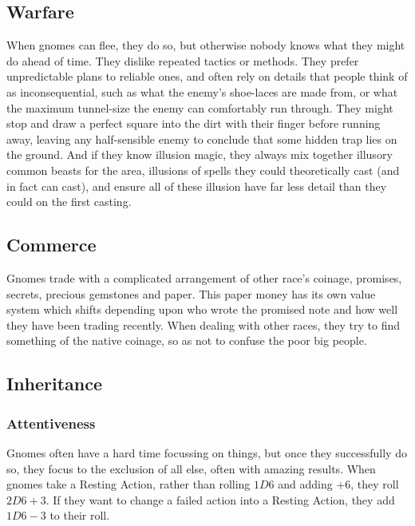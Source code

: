 \begin{multicols}{2}
\subsection{Warfare}

When gnomes can flee, they do so, but otherwise nobody knows what they might do ahead of time.
They dislike repeated tactics or methods.
They prefer unpredictable plans to reliable ones, and often rely on details that people think of as inconsequential, such as what the enemy's shoe-laces are made from, or what the maximum tunnel-size the enemy can comfortably run through.
They might stop and draw a perfect square into the dirt with their finger before running away, leaving any half-sensible enemy to conclude that some hidden trap lies on the ground.
And if they know illusion magic, they always mix together illusory common beasts for the area, illusions of spells they could theoretically cast (and in fact can cast), and ensure all of these illusion have far less detail than they could on the first casting.

\subsection{Commerce}

Gnomes trade with a complicated arrangement of other race's coinage, promises, secrets, precious gemstones and paper. This paper money has its own value system which shifts depending upon who wrote the promised note and how well they have been trading recently. When dealing with other races, they try to find something of the native coinage, so as not to confuse the poor big people.

\subsection{Inheritance}

\subsubsection[Attentiveness: roll 2D6+3 for resting actions]{Attentiveness}
\label{gnomishInheritance}

Gnomes often have a hard time focussing on things, but once they successfully do so, they focus to the exclusion of all else, often with amazing results.
When gnomes take a Resting Action, rather than rolling $1D6$ and adding +6, they roll $2D6+3$.
If they want to change a failed action into a Resting Action, they add $1D6-3$ to their roll.


\end{multicols}
